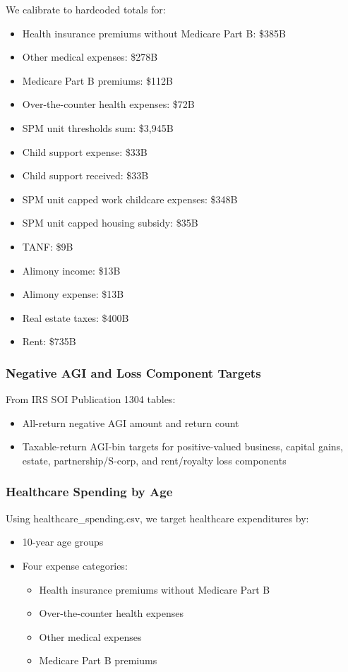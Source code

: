 We calibrate to hardcoded totals for:
\begin{itemize}
    \item Health insurance premiums without Medicare Part B: \$385B
    \item Other medical expenses: \$278B
    \item Medicare Part B premiums: \$112B
    \item Over-the-counter health expenses: \$72B
    \item SPM unit thresholds sum: \$3,945B
    \item Child support expense: \$33B
    \item Child support received: \$33B
    \item SPM unit capped work childcare expenses: \$348B
    \item SPM unit capped housing subsidy: \$35B
    \item TANF: \$9B
    \item Alimony income: \$13B
    \item Alimony expense: \$13B
    \item Real estate taxes: \$400B
    \item Rent: \$735B
\end{itemize}

\subsubsection{Negative AGI and Loss Component Targets}

From IRS SOI Publication 1304 tables:
\begin{itemize}
    \item All-return negative AGI amount and return count
    \item Taxable-return AGI-bin targets for positive-valued business, capital gains, estate, partnership/S-corp, and rent/royalty loss components
\end{itemize}

\subsubsection{Healthcare Spending by Age}

Using healthcare\_spending.csv, we target healthcare expenditures by:
\begin{itemize}
    \item 10-year age groups
    \item Four expense categories:
    \begin{itemize}
        \item Health insurance premiums without Medicare Part B
        \item Over-the-counter health expenses
        \item Other medical expenses
        \item Medicare Part B premiums
    \end{itemize}
\end{itemize}

